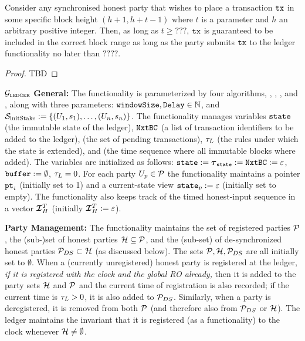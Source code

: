 \begin{proposition}
Consider any synchronised honest party that wishes to place
a transaction $\texttt{tx}$ in some specific block height $(h+1, h+t-1)$ where
$t$ is a parameter and $h$ an arbitrary positive integer.
Then, as long as $t\geq ???$, $\texttt{tx}$ is guaranteed
to be included in the correct block range 
as long as the party submits $\texttt{tx}$ to the ledger functionality 
no later than $????$. 
\end{proposition}

\begin{proof}
TBD
\end{proof}

\begin{systembox}{$\mathcal{G}_{\textsc{ledger}}$}\vspace{1ex}
	\small
{\bf General:}
The functionality is parameterized by four algorithms, \LFvalidate, \LFextend,
	\LFblockify, and \vsync, along with three parameters:  $\texttt{windowSize},
	\texttt{Delay}\in\mathbb{N}$, and $\mathcal{S}_\mathrm{initStake} := \{(U_{1},s_{1}),\ldots,(U_{n},s_{n})\}$.
	The functionality manages variables $\texttt{state}$ (the immutable state of the ledger), $\texttt{NxtBC}$ (a list of transaction identifiers to be added to the ledger), \buffer (the set of pending transactions), $\tau_L$ (the rules under which the state is extended), and \tlast (the time sequence where all immutable blocks where added). The variables are initialized as follows:  
	$\state:=\tlast:= \cbuffer:= \varepsilon$, $\texttt{buffer}:=\emptyset$, $\tau_L=0$.
%
For each party ${U_p}\in\mathcal{P}$ the functionality maintains a pointer $\texttt{pt}_i$
	(initially set to 1) and a current-state view $\texttt{state}_p:=\varepsilon$
	(initially set to empty). The functionality also keeps track of the  timed
	honest-input sequence in a vector $\TIH$ (initially $\TIH:=\varepsilon$).
	\medskip
	
	{\bf Party Management:}
	The functionality maintains the set of registered parties $\mathcal{P}$, the (sub-)set of honest parties $\mathcal{H} \subseteq \mathcal{P}$, and the (sub-set)
	of de-synchronized honest parties $\mathcal{P}_{DS}\subset\mathcal{H}$ (as discussed below). 
	The sets $\mathcal{P}, \mathcal{H}, \mathcal{P}_{DS}$ are all
	initially set to $\emptyset$. When a (currently unregistered) honest party is registered at the ledger, {\em if it is registered with the clock and the global RO already,} then it is
	added to the party sets $\mathcal{H}$ and $\mathcal{P}$ and the current time
	of registration is also recorded; if the current time is $\tau_L > 0$, it is also added to $\mathcal{P}_{DS}$. Similarly, when a party is deregistered, it
	is removed from both $\mathcal{P}$ (and therefore also from $\mathcal{P}_{DS}$ or $\mathcal{H}$). The ledger maintains the invariant that it is registered (as a functionality) to the clock whenever $\mathcal{H} \neq \emptyset$.
	

\end{systembox}

